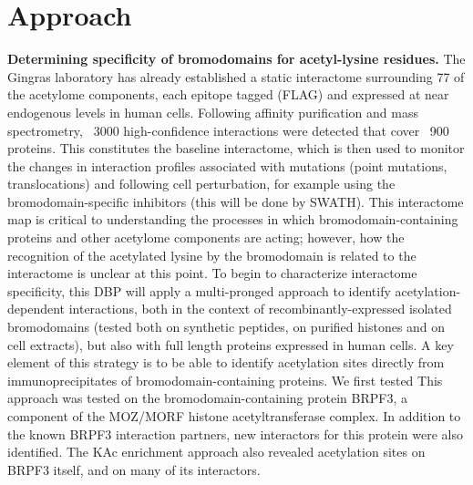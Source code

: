 \documentclass[arial,11pt]{article}
\newcommand{\NeedRevision}[1]{\textcolor{red}{#1}}
\begin{document}
\section{Approach}


{\bf Determining specificity of bromodomains for acetyl-lysine residues.} The Gingras laboratory has already established a static interactome surrounding 77 of the acetylome components, each epitope tagged (FLAG) and expressed at near endogenous levels in human cells. Following affinity purification and mass spectrometry, ~3000 high-confidence interactions were detected that cover ~900 proteins. This constitutes the baseline interactome, which is then used to monitor the changes in interaction profiles associated with mutations (point mutations, translocations) and following cell perturbation, for example using the bromodomain-specific inhibitors (this will be done by SWATH). This interactome map is critical to understanding the processes in which bromodomain-containing proteins and other acetylome components are acting; however, how the recognition of the acetylated lysine by the bromodomain is related to the interactome is unclear at this point. To begin to characterize interactome specificity, this DBP will apply a multi-pronged approach to identify acetylation-dependent interactions, both in the context of recombinantly-expressed isolated bromodomains (tested both on synthetic peptides, on purified histones and on cell extracts), but also with full length proteins expressed in human cells. A key element of this strategy is to be able to identify acetylation sites directly from immunoprecipitates of bromodomain-containing proteins. %
We first tested
This approach was tested on the bromodomain-containing protein BRPF3, a component of the MOZ/MORF histone acetyltransferase complex. In addition to the known BRPF3 interaction partners, new interactors for this protein were also identified. The KAc enrichment approach also revealed acetylation sites on BRPF3 itself, and on many of its interactors.
\end{document}
